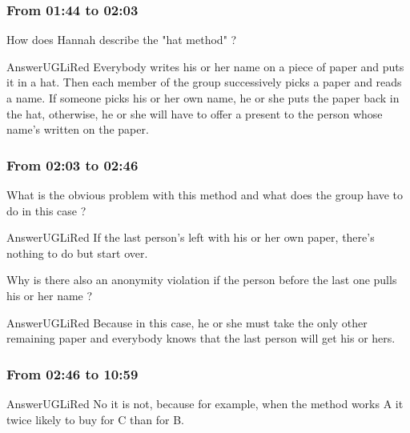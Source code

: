\documentclass[12pt,a4paper,article,english,firamath]{nsi}
\begin{document}
\subsubsection*{From 01:44 to 02:03}
How does Hannah describe the "hat method" ?
\begin{encadrecolore}{Answer}{UGLiRed}
    Everybody writes his or her name on a piece of paper and puts it in a hat.
    Then each member of the group successively picks a paper and reads a name. If someone picks his or her own name, he or she puts the paper back in the hat, otherwise, he or she will have to offer a present to the person whose name's written on the paper.
\end{encadrecolore}
\subsubsection*{From 02:03 to 02:46}
What is the obvious problem with this method and what does the group have to do in this case ?
\begin{encadrecolore}{Answer}{UGLiRed}
    If the last person's left with his or her own paper, there's nothing to do but start over.
\end{encadrecolore}
Why is there also an anonymity violation if the person before the last one pulls his or her name ?
\begin{encadrecolore}{Answer}{UGLiRed}
    Because in this case, he or she must take the only other remaining paper and everybody knows that the last person will get his or hers.
\end{encadrecolore}
\subsubsection*{From 02:46 to 10:59}

\begin{encadrecolore}{Answer}{UGLiRed}
    No it is not, because for example, when the method works A it twice likely to buy for C than for B.
\end{encadrecolore}
\end{document}

